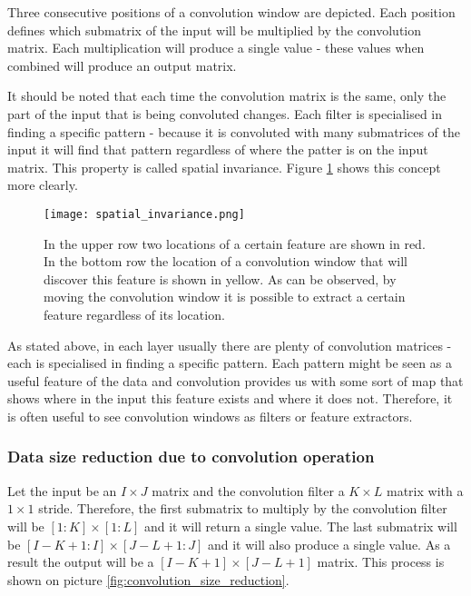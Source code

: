 \documentclass[a4paper,10pt]{report}
\begin{document}
	  Three consecutive positions of a convolution window are depicted. Each position defines which submatrix of the input will be multiplied by the convolution matrix. Each multiplication will produce a single value - these values when combined will produce an output matrix. 
	  
	  It should be noted that each time the convolution matrix is the same, only the part of the input that is being convoluted changes. Each filter is specialised in finding a specific pattern - because it is convoluted with many submatrices of the input it will find that pattern regardless of where the patter is on the input matrix. This property is called spatial invariance. Figure \ref{fig:spatial_invariance} shows this concept more clearly. 
	  	  
	  \begin{figure}[h!]
	    \centering
	    \texttt{[image: spatial\_invariance.png]}
	    \caption{In the upper row two locations of a certain feature are shown in red. In the bottom row the location of a convolution window that will discover this feature is shown in yellow. As can be observed, by moving the convolution window it is possible to extract a certain feature regardless of its location.}
	    \label{fig:spatial_invariance}
	  \end{figure} 
	  
	  
	  As stated above, in each layer usually there are plenty of convolution matrices - each is specialised in finding a specific pattern. Each pattern might be seen as a useful feature of the data and convolution provides us with some sort of map that shows where in the input this feature exists and where it does not. Therefore, it is often useful to see convolution windows as filters or feature extractors. 
	  
	  \subsubsection{Data size reduction due to convolution operation}
	  
 	  Let the input be an $I\times J$ matrix and the convolution filter a $K\times L$ matrix with a $1\times1$ stride. Therefore, the first submatrix to multiply by the convolution filter will be $[1:K]\times[1:L]$ and it will return a single value. The last submatrix will be $[I-K+1:I]\times[J-L+1:J]$ and it will also produce a  single value. As a result the output will be a $[I-K+1]\times[J-L+1]$ matrix. This process is shown on picture \ref{fig:convolution_size_reduction}. 
	  
\end{document}
